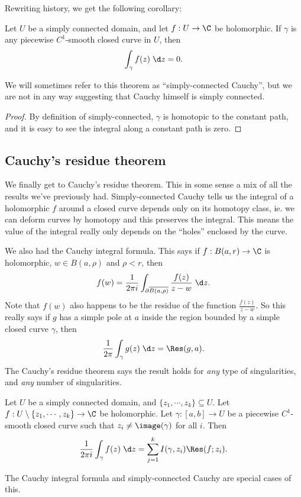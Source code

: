 \documentclass[a4paper]{article}
\begin{document}
Rewriting history, we get the following corollary:
\begin{cor}
  Let $U$ be a simply connected domain, and let $f: U \to \C$ be holomorphic. If $\gamma$ is any piecewise $C^1$-smooth closed curve in $U$, then
  \[
    \int_\gamma f(z)\;\d z = 0.
  \]
\end{cor}
We will sometimes refer to this theorem as ``simply-connected Cauchy'', but we are not in any way suggesting that Cauchy himself is simply connected.

\begin{proof}
  By definition of simply-connected, $\gamma$ is homotopic to the constant path, and it is easy to see the integral along a constant path is zero.
\end{proof}

\subsection{Cauchy's residue theorem}
We finally get to Cauchy's residue theorem. This in some sense a mix of all the results we've previously had. Simply-connected Cauchy tells us the integral of a holomorphic $f$ around a closed curve depends only on its homotopy class, ie. we can deform curves by homotopy and this preserves the integral. This means the value of the integral really only depends on the ``holes'' enclosed by the curve.

We also had the Cauchy integral formula. This says if $f: B(a, r) \to \C$ is holomorphic, $w \in B(a, \rho)$ and $\rho < r$, then
\[
  f(w) = \frac{1}{2\pi i} \int_{\partial \overline{B(a, \rho)}} \frac{f(z)}{z - w}\;\d z.
\]
Note that $f(w)$ also happens to be the residue of the function $\frac{f(z)}{z - w}$. So this really says if $g$ has a simple pole at $a$ inside the region bounded by a simple closed curve $\gamma$, then
\[
  \frac{1}{2\pi} \int_\gamma g(z)\;\d z = \Res (g, a).
\]
The Cauchy's residue theorem says the result holds for \emph{any} type of singularities, and \emph{any} number of singularities.

\begin{thm}
  Let $U$ be a simply connected domain, and $\{z_1, \cdots, z_k\} \subseteq U$. Let $f: U \setminus \{z_1, \cdots, z_k\} \to \C$ be holomorphic. Let $\gamma: [a, b] \to U$ be a piecewise $C^1$-smooth closed curve such that $z_i \not= \image(\gamma)$ for all $i$. Then
  \[
    \frac{1}{2\pi i} \int_{\gamma}f(z)\;\d z = \sum_{j = 1}^k I(\gamma, z_i) \Res(f; z_i).
  \]
\end{thm}
The Cauchy integral formula and simply-connected Cauchy are special cases of this.
\end{document}

